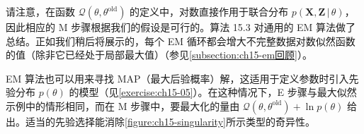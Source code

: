 \documentclass[../../main.tex]{subfiles}
\begin{document}
请注意，在函数 $\mathcal{Q}(\theta,\theta^{\text{old}})$ 的定义中，对数直接作用于联合分布 $p(\bm{X},\bm{Z}\,|\,\theta)$，因此相应的 M 步骤根据我们的假设是可行的。算法 15.3 对通用的 EM 算法做了总结。正如我们稍后将展示的，每个 EM 循环都会增大不完整数据对数似然函数的值（除非它已经处于局部最大值）（参见\cref{subsection:ch15-em回顾}）。

\begin{center}
\setlength{\fboxsep}{7pt}%
\end{center}

EM 算法也可以用来寻找 MAP（最大后验概率）解，这适用于定义参数时引入先验分布 $p(\theta)$ 的模型（见\cref{exercise:ch15-05}）。在这种情况下，E 步骤与最大似然示例中的情形相同，而在 M 步骤中，要最大化的量由 $\mathcal{Q}(\theta,\theta^{\text{old}})+\ln p(\theta)$ 给出。适当的先验选择能消除\cref{figure:ch15-singularity}所示类型的奇异性。
\end{document}
